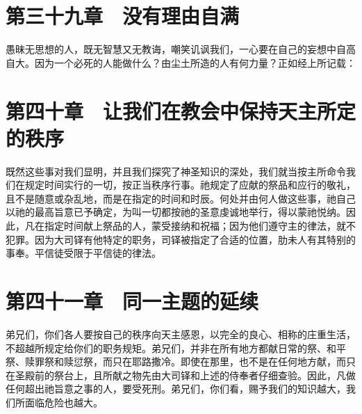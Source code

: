 
\section{第三十九章　没有理由自满}

愚昧无思想的人，既无智慧又无教诲，嘲笑讥讽我们，一心要在自己的妄想中自高自大。因为一个必死的人能做什么？由尘土所造的人有何力量？正如经上所记载：\par


\section{第四十章　让我们在教会中保持天主所定的秩序}

既然这些事对我们显明，并且我们探究了神圣知识的深处，我们就当按主所命令我们在规定时间实行的一切，按正当秩序行事。祂规定了应献的祭品和应行的敬礼，且不是随意或杂乱地，而是在指定的时间和时辰。何处并由何人做这些事，祂自己以祂的最高旨意已予确定，为叫一切都按祂的圣意虔诚地举行，得以蒙祂悦纳。因此，凡在指定时间献上祭品的人，蒙受接纳和祝福；因为他们遵守主的律法，就不犯罪。因为大司铎有他特定的职务，司铎被指定了合适的位置，肋未人有其特别的事奉。平信徒受限于平信徒的律法。\par


\section{第四十一章　同一主题的延续}

弟兄们，你们各人要按自己的秩序向天主感恩，以完全的良心、相称的庄重生活，不超越所规定给你们的职务规矩。弟兄们，并非在所有地方都献日常的祭、和平祭、赎罪祭和赎愆祭，而只在耶路撒冷。即使在那里，也不是在任何地方献，而只在圣殿前的祭台上，且所献之物先由大司铎和上述的侍奉者仔细查验。因此，凡做任何超出祂旨意之事的人，要受死刑。弟兄们，你们看，赐予我们的知识越大，我们所面临危险也越大。\par

